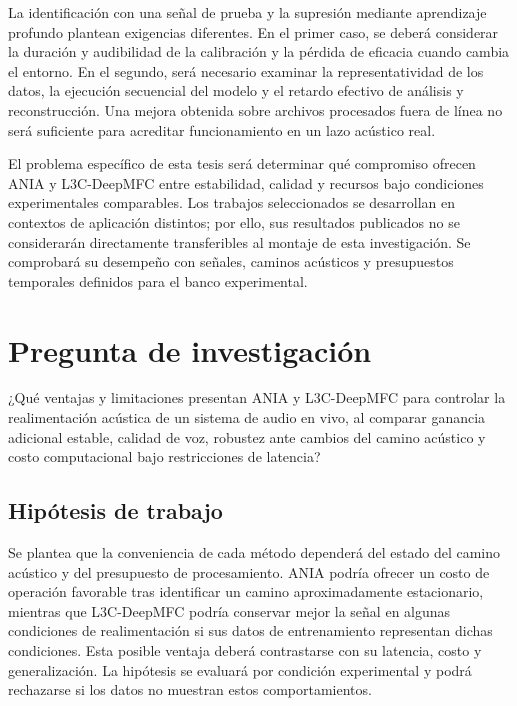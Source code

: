 La identificación con una señal de prueba y la supresión mediante aprendizaje profundo plantean exigencias diferentes. En el primer caso, se deberá considerar la duración y audibilidad de la calibración y la pérdida de eficacia cuando cambia el entorno. En el segundo, será necesario examinar la representatividad de los datos, la ejecución secuencial del modelo y el retardo efectivo de análisis y reconstrucción. Una mejora obtenida sobre archivos procesados fuera de línea no será suficiente para acreditar funcionamiento en un lazo acústico real.

El problema específico de esta tesis será determinar qué compromiso ofrecen ANIA y L3C-DeepMFC entre estabilidad, calidad y recursos bajo condiciones experimentales comparables. Los trabajos seleccionados se desarrollan en contextos de aplicación distintos; por ello, sus resultados publicados no se considerarán directamente transferibles al montaje de esta investigación. Se comprobará su desempeño con señales, caminos acústicos y presupuestos temporales definidos para el banco experimental.

\section{Pregunta de investigación}
¿Qué ventajas y limitaciones presentan ANIA y L3C-DeepMFC para controlar la realimentación acústica de un sistema de audio en vivo, al comparar ganancia adicional estable, calidad de voz, robustez ante cambios del camino acústico y costo computacional bajo restricciones de latencia?

\subsection{Hipótesis de trabajo}
Se plantea que la conveniencia de cada método dependerá del estado del camino acústico y del presupuesto de procesamiento. ANIA podría ofrecer un costo de operación favorable tras identificar un camino aproximadamente estacionario, mientras que L3C-DeepMFC podría conservar mejor la señal en algunas condiciones de realimentación si sus datos de entrenamiento representan dichas condiciones. Esta posible ventaja deberá contrastarse con su latencia, costo y generalización. La hipótesis se evaluará por condición experimental y podrá rechazarse si los datos no muestran estos comportamientos.
